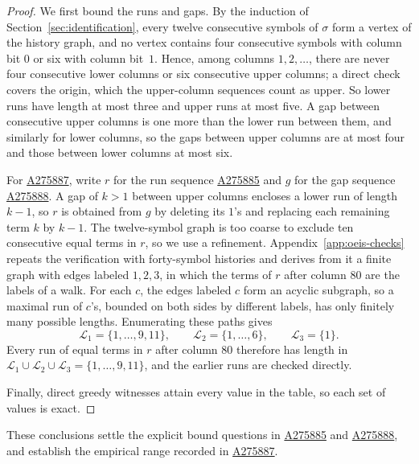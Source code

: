 \begin{proof}
We first bound the runs and gaps. By the induction of
Section~\ref{sec:identification}, every twelve consecutive symbols of
$\sigma$ form a vertex of the history graph, and no vertex contains
four consecutive symbols with column bit $0$ or six with column
bit~$1$. Hence, among columns $1,2,\dots$, there are never four
consecutive lower columns or six consecutive upper columns; a direct
check covers the origin, which the upper-column sequences count as
upper. So lower runs have length at most three and upper runs at most
five. A gap between consecutive upper columns is one more than the
lower run between them, and similarly for lower columns, so the gaps
between upper columns are at most four and those between lower
columns at most six.

For \href{https://oeis.org/A275887}{A275887}, write $r$ for the run
sequence \href{https://oeis.org/A275885}{A275885} and $g$ for the gap
sequence \href{https://oeis.org/A275888}{A275888}. A gap of $k>1$
between upper columns encloses a lower run of length $k-1$, so $r$ is
obtained from $g$ by deleting its $1$'s and replacing each remaining
term $k$ by $k-1$. The twelve-symbol graph is too coarse to exclude
ten consecutive equal terms in $r$, so we use a refinement.
Appendix~\ref{app:oeis-checks} repeats the verification with
forty-symbol histories and derives from it a finite graph with edges
labeled $1,2,3$, in which the terms of $r$ after column $80$ are the
labels of a walk. For each $c$, the edges labeled $c$ form an acyclic
subgraph, so a maximal run of $c$'s, bounded on both sides by
different labels, has only finitely many possible lengths.
Enumerating these paths gives
\[
 \mathcal L_1=\{1,\ldots,9,11\},\qquad
 \mathcal L_2=\{1,\ldots,6\},\qquad
 \mathcal L_3=\{1\}.
\]
Every run of equal terms in $r$ after column $80$ therefore has
length in $\mathcal L_1\cup\mathcal L_2\cup\mathcal L_3=
\{1,\ldots,9,11\}$, and the earlier runs are checked directly.

Finally, direct greedy witnesses attain every value in the table, so
each set of values is exact.
\end{proof}

These conclusions settle the explicit bound questions in
\href{https://oeis.org/A275885}{A275885} and
\href{https://oeis.org/A275888}{A275888}, and establish the empirical
range recorded in \href{https://oeis.org/A275887}{A275887}.

